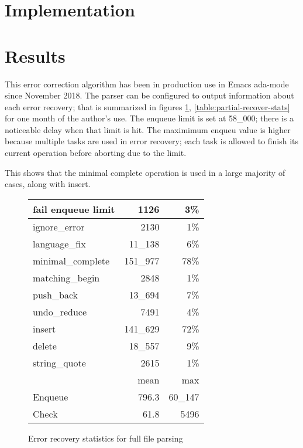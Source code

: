 \documentclass{article}
\begin{document}
\section{Implementation}

\section{Results}
This error correction algorithm has been in production use in Emacs
ada-mode since November 2018. The parser can be configured to output
information about each error recovery; that is summarized in figures
\ref{table:full-recover-stats}, \ref{table:partial-recover-stats} for one
month of the author's use. The enqueue limit is set at 58\_000; there is a
noticeable delay when that limit is hit. The maximimum enqueu value is
higher because multiple tasks are used in error recovery; each task is
allowed to finish its current operation before aborting due to the limit.

This shows that the minimal complete operation is used in a large
majority of cases, along with insert.

\begin{figure}[H]
\begin{tabular}{| l | r | r |}
\hline
fail enqueue limit    & 1126     & 3\%     \\
\hline
ignore\_error         & 2130     & 1\%     \\
language\_fix         & 11\_138  & 6\%     \\
minimal\_complete     & 151\_977 & 78\%    \\
matching\_begin       & 2848     & 1\%     \\
push\_back            & 13\_694  & 7\%     \\
undo\_reduce          & 7491     & 4\%     \\
insert                & 141\_629 & 72\%    \\
delete                & 18\_557  & 9\%     \\
string\_quote         & 2615     & 1\%     \\
\hline
                      & mean     & max     \\
Enqueue               & 796.3    & 60\_147 \\
Check                 & 61.8     & 5496  \\
\hline
\end{tabular}
\caption{Error recovery statistics for full file parsing}
\label{table:full-recover-stats}
\end{figure}
\end{document}
